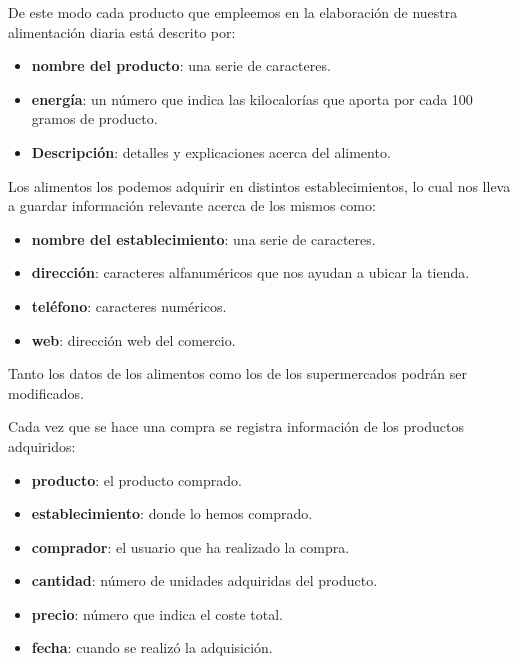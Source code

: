 \documentclass[a4paper,12pt]{report}
\begin{document}
De este modo cada producto que empleemos en la elaboración de
nuestra alimentación diaria está descrito por:
\begin{itemize}
\item \textbf{nombre del producto}: una serie de caracteres.
\item \textbf{energía}: un número que indica las kilocalorías que aporta por
cada 100 gramos de producto.
\item \textbf{Descripción}: detalles y explicaciones acerca del alimento.
\end{itemize}

Los alimentos los podemos adquirir en distintos establecimientos,
lo cual nos lleva a guardar información relevante acerca de los
mismos como:
\begin{itemize}
\item \textbf{nombre del establecimiento}: una serie de caracteres.
\item \textbf{dirección}: caracteres alfanuméricos que nos ayudan a ubicar la tienda.
\item \textbf{teléfono}: caracteres numéricos.
\item \textbf{web}: dirección web del comercio.
\end{itemize}

Tanto los datos de los alimentos como los de los supermercados
podrán ser modificados.


Cada vez que se hace una compra se registra información de los
productos adquiridos:
\begin{itemize}
\item \textbf{producto}: el producto comprado.
\item \textbf{establecimiento}: donde lo hemos comprado.
\item \textbf{comprador}: el usuario que ha realizado la compra.
\item \textbf{cantidad}: número de unidades adquiridas del producto.
\item \textbf{precio}: número que indica el coste total.
\item \textbf{fecha}: cuando se realizó la adquisición.
\end{itemize}

\newpage
\end{document}

